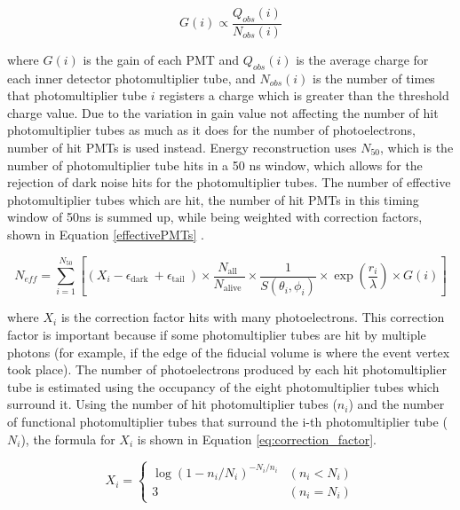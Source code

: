 \begin{equation}
    G(i) \propto \frac{Q_{o b s}(i)}{N_{o b s}(i)}
\label{gain_equation}
\end{equation}

where $G(i)$ is the gain of each PMT and $Q_{obs}(i)$ is the average charge for each inner detector photomultiplier tube, and $N_{obs}(i)$ is the number of times that photomultiplier tube $i$ registers a charge which is greater than the threshold charge value. Due to the variation in gain value not affecting the number of hit photomultiplier tubes as much as it does for the number of photoelectrons, number of hit PMTs is used instead. Energy reconstruction uses $N_{50}$, which is the number of photomultiplier tube hits in a 50 ns window, which allows for the rejection of dark noise hits for the photomultiplier tubes. The number of effective photomultiplier tubes which are hit, the number of hit PMTs in this timing window of 50ns is summed up, while being weighted with correction factors, shown in Equation \ref{effectivePMTs} \cite{uenoAnalysisNuclearDeexcitationa}. 

\begin{equation}
    N_{e f f}=\sum_{i=1}^{N_{50}}\left[\left(X_{i}-\epsilon_{\text {dark }}+\epsilon_{\text {tail }}\right) \times \frac{N_{\text {all }}}{N_{\text {alive }}} \times \frac{1}{S\left(\theta_{i}, \phi_{i}\right)} \times \exp \left(\frac{r_{i}}{\lambda}\right) \times G(i)\right]
    \label{effectivePMTs}
\end{equation}

where $X_{i}$ is the correction factor hits with many photoelectrons. This correction factor is important because if some photomultiplier tubes are hit by multiple photons (for example, if the edge of the fiducial volume is where the event vertex took place). The number of photoelectrons produced by each hit photomultiplier tube is estimated using the occupancy of the eight photomultiplier tubes which surround it. Using the number of hit photomultiplier tubes ($n_{i}$) and the number of functional photomultiplier tubes that surround the i-th photomultiplier tube ($N_{i}$), the formula for $X_{i}$ is shown in Equation \ref{eq:correction_factor}.

\begin{equation}
    X_{i}=\left\{\begin{array}{ll}
    \log \left(1-n_{i} / N_{i}\right)^{-N_{i} / n_{i}} & \left(n_{i}<N_{i}\right) \\
    3 & \left(n_{i}=N_{i}\right)
    \end{array}\right.
    \label{eq:correction_factor}
\end{equation}


